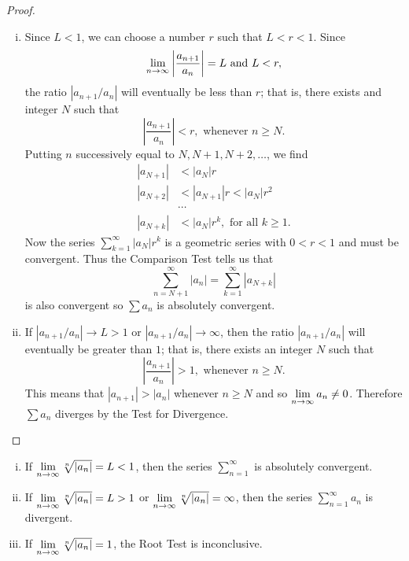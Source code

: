 \documentclass[a4paper,8pt]{article}
\begin{document}
\begin{outline}
    \begin{proof}
      \begin{enumerate}[i.]
        \item
          Since \(L < 1\), we can choose a number \(r\) such that \(L < r < 1\). Since \[\lim\limits_{n\rightarrow \infty^{}}\left|\frac{a_{n+1}}{a_n}\right| = L \text{ and }
          L < r, \] the ratio \(|a_{n+1}/a_n|\) will eventually be less than \(r\); that is, there exists and integer \(N\) such that
          \[ \left|\frac{a_{n+1}}{a_n}\right| < r, \text{ whenever } n \geq N\text{.} \]
          Putting \(n\) successively equal to \(N, N+1, N+2, \ldots\), we find
          \begin{align*}
            |a_{N+1}| &< |a_N|r \\
            |a_{N+2}| &< |a_{N+1}|r < |a_N|r^2 \\
                      &\cdots \\
            |a_{N+k}| &< |a_N|r^k, \text{ for all } k \geq 1\text{.}
          \end{align*}
          Now the series \( \sum_{k=1}^{\infty}|a_N|r^k \) is a geometric series with \(0 < r < 1\) and must be convergent. Thus the Comparison Test
          tells us that \[ \sum_{n=N+1}^{\infty} |a_n| = \sum_{k=1}^{\infty} |a_{N+k}| \] is also convergent so \(\sum a_n\) is absolutely convergent.
        \item
          If \(|a_{n+1}/a_n| \rightarrow L > 1\) or \(|a_{n+1}/a_n| \rightarrow \infty\), then the ratio \(|a_{n+1}/a_n|\) will eventually be greater
          than \(1\); that is, there exists an integer \(N\) such that \[ \left|\frac{a_{n+1}}{a_n}\right| > 1,\text{ whenever } n \geq N\text{.} \]
          This means that \(|a_{n+1}| > |a_n|\) whenever \(n \geq N\) and so \(\lim\limits_{n\rightarrow \infty^{}} a_n \neq 0\). Therefore \(\sum a_n\) diverges by
          the Test for Divergence.
      \end{enumerate}
    \end{proof}

    \begin{enumerate}[i.]
      \item
        If \(\lim\limits_{n\rightarrow \infty^{}} \sqrt[n]{|a_n|} = L < 1\), then the series \(\sum_{n=1}^{\infty}\) is absolutely convergent.
      \item
        If \(\lim\limits_{n\rightarrow \infty^{}} \sqrt[n]{|a_n|} = L > 1\) or \(\lim\limits_{n\rightarrow \infty^{}} \sqrt[n]{|a_n|} = \infty\), then the series \(\sum_{n=1}^{\infty} a_n\)
        is divergent.
      \item
        If \(\lim\limits_{n\rightarrow \infty^{}} \sqrt[n]{|a_n|} = 1\), the Root Test is inconclusive.
    \end{enumerate}


\end{outline}
\end{document}
